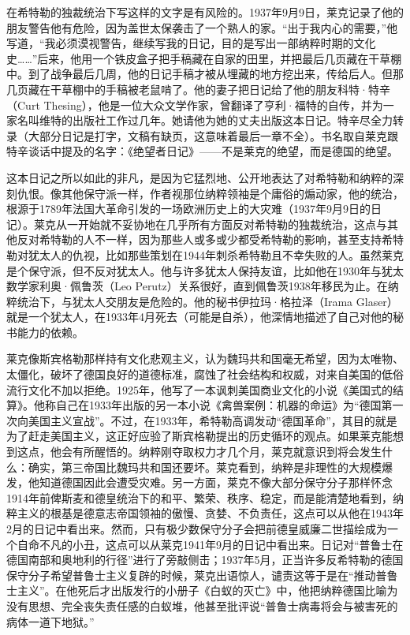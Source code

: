 \documentclass[UTF8]{ctexart}
\begin{document}
在希特勒的独裁统治下写这样的文字是有风险的。1937年9月9日，莱克记录了他的朋友警告他有危险，因为盖世太保袭击了一个熟人的家。“出于我内心的需要，”他写道，“我必须漠视警告，继续写我的日记，目的是写出一部纳粹时期的文化史……”后来，他用一个铁皮盒子把手稿藏在自家的田里，并把最后几页藏在干草棚中。到了战争最后几周，他的日记手稿才被从埋藏的地方挖出来，传给后人。但那几页藏在干草棚中的手稿被老鼠啃了。他的妻子把日记给了他的朋友科特·特辛（Curt Thesing），他是一位大众文学作家，曾翻译了亨利·福特的自传，并为一家名叫维特的出版社工作过几年。她请他为她的丈夫出版这本日记。特辛尽全力转录（大部分日记是打字，文稿有缺页，这意味着最后一章不全）。书名取自莱克跟特辛谈话中提及的名字：《绝望者日记》——不是莱克的绝望，而是德国的绝望。

这本日记之所以如此的非凡，是因为它猛烈地、公开地表达了对希特勒和纳粹的深刻仇恨。像其他保守派一样，作者视那位纳粹领袖是个庸俗的煽动家，他的统治，根源于1789年法国大革命引发的一场欧洲历史上的大灾难（1937年9月9日的日记）。莱克从一开始就不妥协地在几乎所有方面反对希特勒的独裁统治，这点与其他反对希特勒的人不一样，因为那些人或多或少都受希特勒的影响，甚至支持希特勒对犹太人的仇视，比如那些策划在1944年刺杀希特勒且不幸失败的人。虽然莱克是个保守派，但不反对犹太人。他与许多犹太人保持友谊，比如他在1930年与犹太数学家利奥·佩鲁茨（Leo Perutz）关系很好，直到佩鲁茨1938年移民为止。在纳粹统治下，与犹太人交朋友是危险的。他的秘书伊拉玛·格拉泽（Irama Glaser）就是一个犹太人，在1933年4月死去（可能是自杀），他深情地描述了自己对他的秘书能力的依赖。

莱克像斯宾格勒那样持有文化悲观主义，认为魏玛共和国毫无希望，因为太唯物、太僵化，破坏了德国良好的道德标准，腐蚀了社会结构和权威，对来自美国的低俗流行文化不加以拒绝。1925年，他写了一本讽刺美国商业文化的小说《美国式的结算》。他称自己在1933年出版的另一本小说《禽兽案例：机器的命运》为“德国第一次向美国主义宣战”。不过，在1933年，希特勒高调发动“德国革命”，其目的就是为了赶走美国主义，这正好应验了斯宾格勒提出的历史循环的观点。如果莱克能想到这点，他会有所醒悟的。纳粹刚夺取权力才几个月，莱克就意识到将会发生什么：确实，第三帝国比魏玛共和国还要坏。莱克看到，纳粹是非理性的大规模爆发，他知道德国因此会遭受灾难。另一方面，莱克不像大部分保守分子那样怀念1914年前俾斯麦和德皇统治下的和平、繁荣、秩序、稳定，而是能清楚地看到，纳粹主义的根基是德意志帝国领袖的傲慢、贪婪、不负责任，这点可以从他在1943年2月的日记中看出来。然而，只有极少数保守分子会把前德皇威廉二世描绘成为一个自命不凡的小丑，这点可以从莱克1941年9月的日记中看出来。日记对“普鲁士在德国南部和奥地利的行径”进行了旁敲侧击；1937年5月，正当许多反希特勒的德国保守分子希望普鲁士主义复辟的时候，莱克出语惊人，谴责这等于是在“推动普鲁士主义”。在他死后才出版发行的小册子《白蚁的灭亡》中，他把纳粹德国比喻为没有思想、完全丧失责任感的白蚁堆，他甚至批评说“普鲁士病毒将会与被害死的病体一道下地狱。”
\end{document}
